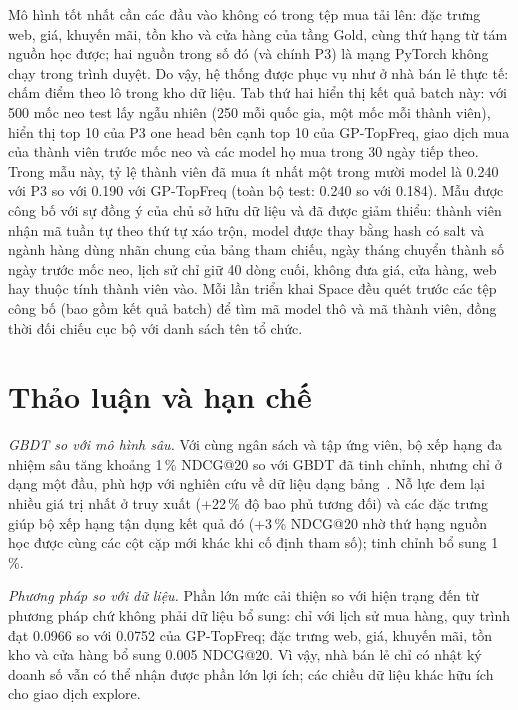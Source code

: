 \documentclass[jtehm]{ieeeaccess}
\begin{document}
Mô hình tốt nhất cần các đầu vào không có trong tệp mua tải lên: đặc trưng web, giá, khuyến mãi, tồn kho và cửa hàng của tầng Gold, cùng thứ hạng từ tám nguồn học được; hai nguồn trong số đó (và chính P3) là mạng PyTorch không chạy trong trình duyệt. Do vậy, hệ thống được phục vụ như ở nhà bán lẻ thực tế: chấm điểm theo lô trong kho dữ liệu. Tab thứ hai hiển thị kết quả batch này: với 500 mốc neo test lấy ngẫu nhiên (250 mỗi quốc gia, một mốc mỗi thành viên), hiển thị top 10 của P3 one head bên cạnh top 10 của GP-TopFreq, giao dịch mua của thành viên trước mốc neo và các model họ mua trong 30 ngày tiếp theo. Trong mẫu này, tỷ lệ thành viên đã mua ít nhất một trong mười model là 0.240 với P3 so với 0.190 với GP-TopFreq (toàn bộ test: 0.240 so với 0.184). Mẫu được công bố với sự đồng ý của chủ sở hữu dữ liệu và đã được giảm thiểu: thành viên nhận mã tuần tự theo thứ tự xáo trộn, model được thay bằng hash có salt và ngành hàng dùng nhãn chung của bảng tham chiếu, ngày tháng chuyển thành số ngày trước mốc neo, lịch sử chỉ giữ 40 dòng cuối, không đưa giá, cửa hàng, web hay thuộc tính thành viên vào. Mỗi lần triển khai Space đều quét trước các tệp công bố (bao gồm kết quả batch) để tìm mã model thô và mã thành viên, đồng thời đối chiếu cục bộ với danh sách tên tổ chức.

\section{Thảo luận và hạn chế}
\label{sec:discussion}

\textit{GBDT so với mô hình sâu.} Với cùng ngân sách và tập ứng viên, bộ xếp hạng đa nhiệm sâu tăng khoảng 1\,\% NDCG@20 so với GBDT đã tinh chỉnh, nhưng chỉ ở dạng một đầu, phù hợp với nghiên cứu về dữ liệu dạng bảng~\cite{grinsztajn2022tabular}. Nỗ lực đem lại nhiều giá trị nhất ở truy xuất (+22\,\% độ bao phủ tương đối) và các đặc trưng giúp bộ xếp hạng tận dụng kết quả đó (+3\,\% NDCG@20 nhờ thứ hạng nguồn học được cùng các cột cặp mới khác khi cố định tham số); tinh chỉnh bổ sung 1\,\%.

\textit{Phương pháp so với dữ liệu.} Phần lớn mức cải thiện so với hiện trạng đến từ phương pháp chứ không phải dữ liệu bổ sung: chỉ với lịch sử mua hàng, quy trình đạt 0.0966 so với 0.0752 của GP-TopFreq; đặc trưng web, giá, khuyến mãi, tồn kho và cửa hàng bổ sung 0.005 NDCG@20. Vì vậy, nhà bán lẻ chỉ có nhật ký doanh số vẫn có thể nhận được phần lớn lợi ích; các chiều dữ liệu khác hữu ích cho giao dịch explore.
\end{document}
